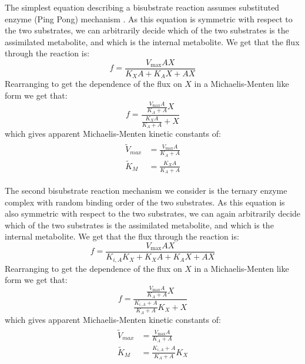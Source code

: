   The simplest equation describing a bisubstrate reaction assumes substituted enzyme (Ping Pong) mechanism \cite{Imperial2014-nw}.
  As this equation is symmetric with respect to the two substrates, we can arbitrarily decide which of the two substrates is the assimilated metabolite, and which is the internal metabolite.
  We get that the flux through the reaction is:
  \begin{equation*}
      f=\frac{V_{\max}AX}{K_XA+K_{A}X+AX}
  \end{equation*}
  Rearranging to get the dependence of the flux on $X$ in a Michaelis-Menten like form we get that:
  \begin{equation}
      \label{eq:pingpongmm}
      f=\frac{\frac{V_{\max}A}{K_A+A}X}{\frac{K_XA}{K_A+A}+X}
  \end{equation}
  which gives apparent Michaelis-Menten kinetic constants of:
  \begin{align}
  \begin{split}
      \label{eq:paramsping}
      \tilde{V}_{max}&=\frac{V_{\max}A}{K_A+A} \\
      \tilde{K}_M&=\frac{K_XA}{K_A+A}
  \end{split}
  \end{align}


  The second bisubstrate reaction mechanism we consider is the ternary enzyme complex with random binding order of the two substrates.
  As this equation is also symmetric with respect to the two substrates, we can again arbitrarily decide which of the two substrates is the assimilated metabolite, and which is the internal metabolite.
  We get that the flux through the reaction is:
  \begin{equation*}
      f=\frac{V_{\max}AX}{K_{i,A}K_X+K_XA+K_AX+AX}
  \end{equation*}
  Rearranging to get the dependence of the flux on $X$ in a Michaelis-Menten like form we get that:
  \begin{equation}
      \label{eq:birandmm}
      f=\frac{\frac{V_{\max}A}{K_A+A}X}{\frac{K_{i,A}+A}{K_A+A}K_X+X}
  \end{equation}
  which gives apparent Michaelis-Menten kinetic constants of:
  \begin{align}
  \begin{split}
      \label{eq:paramssym}
      \tilde{V}_{max}&=\frac{V_{\max}A}{K_A+A} \\
      \tilde{K}_M&=\frac{K_{i,A}+A}{K_A+A}K_X
  \end{split}
  \end{align}

